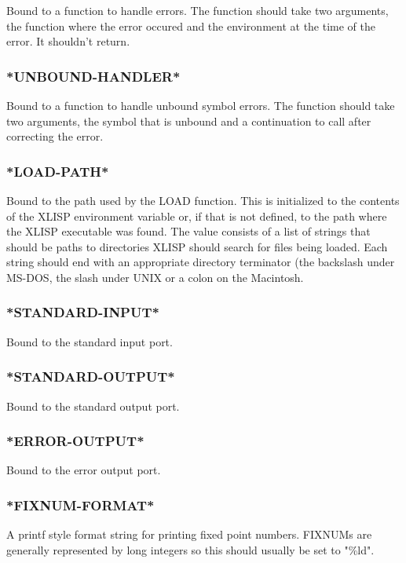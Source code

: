 \documentclass[11pt]{article}
\begin{document}
Bound to a function to handle errors.  The function should take two
arguments, the function where the error occured and the environment
at the time of the error.  It shouldn't return.
\subsubsection{\textrm{*UNBOUND-HANDLER*}}
\label{sec-4-2-4}

Bound to a function to handle unbound symbol errors.  The function
should take two arguments, the symbol that is unbound and a
continuation to call after correcting the error.
\subsubsection{\textrm{*LOAD-PATH*}}
\label{sec-4-2-5}

Bound to the path used by the LOAD function.  This is initialized to
the contents of the XLISP environment variable or, if that is not
defined, to the path where the XLISP executable was found.  The value
consists of a list of strings that should be paths to directories
XLISP should search for files being loaded.  Each string should end
with an appropriate directory terminator (the backslash under MS-DOS,
the slash under UNIX or a colon on the Macintosh.
\subsubsection{\textrm{*STANDARD-INPUT*}}
\label{sec-4-2-6}

Bound to the standard input port.
\subsubsection{\textrm{*STANDARD-OUTPUT*}}
\label{sec-4-2-7}

Bound to the standard output port.
\subsubsection{\textrm{*ERROR-OUTPUT*}}
\label{sec-4-2-8}

Bound to the error output port.
\subsubsection{\textrm{*FIXNUM-FORMAT*}}
\label{sec-4-2-9}

A printf style format string for printing fixed point numbers.
FIXNUMs are generally represented by long integers so this should
usually be set to "\%ld".
\end{document}
